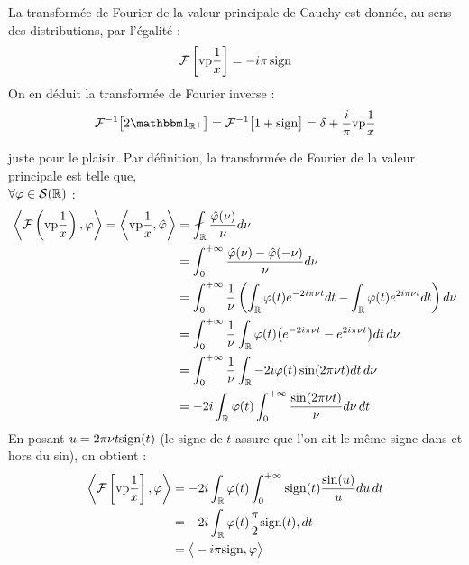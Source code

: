 \begin{propriete}\label{prop:fou2vp}
	La transformée de Fourier de la valeur principale de Cauchy est donnée, au sens des distributions, par l'égalité :
	\begin{equation}
		\mathcal{F} \left[\text{vp} \frac{1}{x} \right]= -i \pi\, \text{sign}{} 
	\end{equation}
	On en déduit la transformée de Fourier inverse :
	\begin{equation}
	\mathcal{F}^{-1}\big[ 2\one_{\R^+} \big] = \mathcal{F}^{-1}\big[ 1 + \sign \big] = \delta + \frac{i}{\pi} \text{vp}\frac{1}{x}
	\end{equation}
	
	\begin{demo}
		juste pour le plaisir. Par définition, la transformée de Fourier de la valeur principale est telle que,\\ $\forall \varphi\in\mathcal{S}(\mathbb{R})$ :
		\begin{align*}
		\left\langle \mathcal{F} \left(\text{vp} \frac{1}{x} \right), \varphi \right\rangle = \left\langle \text{vp} \frac{1}{x}, \hat{\varphi} \right\rangle 
		&= \fint_\R \frac{\hat{\varphi}(\nu)}{\nu} d\nu \\
			&= \int_0^{+\infty} \frac{\hat{\varphi}(\nu) - \hat{\varphi}(-\nu)}{\nu} d\nu \\
			&= \int_0^{+\infty} \frac{1}{\nu} \left( \int_\R\varphi(t)e^{-2i\pi \nu t}dt - \int_\R\varphi(t)e^{2i\pi \nu t}dt \right)d\nu \\
			&= \int_0^{+\infty} \frac{1}{\nu}\int_\R\varphi(t)\big(e^{-2i\pi \nu t} - e^{2i\pi \nu t}\big)dt\, d\nu \\
			&= \int_0^{+\infty} \frac{1}{\nu}\int_\R-2i\varphi(t)\sin(2\pi \nu t)dt\, d\nu \\
			&= -2i\int_\R\varphi(t)\int_0^{+\infty} \frac{\sin(2\pi \nu t)}{\nu}d\nu\, dt
		\end{align*}
		En posant $u=2\pi\nu t\text{sign}(t)$ (le signe de $t$ assure que l'on ait le même signe dans et hors du sin), on obtient :
		\begin{align*}
		\left\langle \mathcal{F} \left[\text{vp} \frac{1}{x} \right], \varphi \right\rangle &= -2i\int_{\mathbb{R}}\varphi(t)\int_0^{+\infty} \text{sign}(t)\frac{\sin(u)}{u}du\, dt \\
		&= -2i\int_{\mathbb{R}}\varphi(t)\frac{\pi}{2}\text{sign}(t), dt \\
		&= \big\langle -i\pi\text{sign}, \varphi \big\rangle
		\end{align*}
	\end{demo}
\end{propriete}

